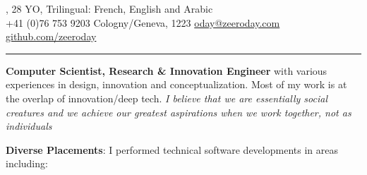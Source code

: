\documentclass[a4paper, 10pt]{article}
\begin{document}

\begin{center}

\color{headings}\textsc{\Huge{}}, 28 YO, \small{Trilingual: French, English and Arabic}\\
\vspace{1mm}
\color{text1}{\large\Telefon} +41 (0)76 753 9203 
\hfill {\large\faMapMarker} Cologny/Geneva, 1223 
\hfill {\large\faEnvelope} \href{mailto:oday@zeeroday.com}{oday@zeeroday.com} 
\hfill \color{text1}{\large\faGithub} \href{https://github.com/zeeroday}{github.com/zeeroday}
\hfill {}

\rule{\textwidth}{2pt}

\vspace{-5pt}
\begin{flushleft}
	\textbf{Computer Scientist, Research \& Innovation Engineer}  with various experiences in design, innovation and conceptualization. Most of my work is at the overlap of innovation/deep tech. \textit{I believe that we are essentially social creatures and we achieve our greatest aspirations when we work together, not as individuals}
\end{flushleft}
\begin{center}
\textbf{\fontsize{11pt}{11}\selectfont Diverse Placements}: I performed technical software developments in areas including:

\space
{}
\space
{}
\space
{}
\end{center}


\end{center}
\end{document}
